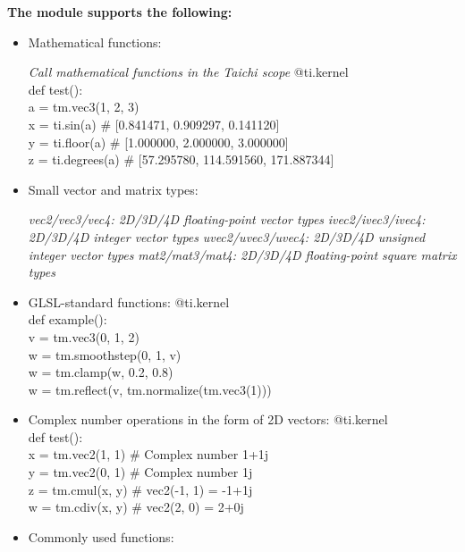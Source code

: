 \documentclass[10pt,landscape,a4paper]{article}
\newenvironment{myboxed}[1]
{\begin{mdframed}[linecolor=black,
                  backgroundcolor=white,
                  outerlinewidth=0.25pt,
                  innertopmargin=1ex,
                  topline=true,
                  rightline=true,
                  leftline=true,
                  bottomline=true,
                  linecolor=black!0,
                  frametitleaboveskip=0.5em,
                  frametitlebelowskip=0.5em,
                  innerbottommargin=.5\baselineskip,
                  innerrightmargin=.5em,
                  innerleftmargin=.5em,
                  frametitle={\footnotesize \RobotoSlab \bfseries \hspace*{0mm} #1},
                  frametitlebackgroundcolor=black!5,
                  frametitlerulewidth=2pt]}
{\end{mdframed}}
\begin{document}
\begin{multicols*}{5}
\begin{myboxed}{Math \hfill}
  \textbf{The module supports the following:}
  \begin{itemize}
  \item Mathematical functions:
  
  \textit{Call mathematical functions in the Taichi scope}
  {\ttfamily \scriptsize
  @ti.kernel \\
  def test(): \\
      a = tm.vec3(1, 2, 3) \\
      x = ti.sin(a) # [0.841471, 0.909297, 0.141120] \\
      y = ti.floor(a) # [1.000000, 2.000000, 3.000000] \\
      z = ti.degrees(a) # [57.295780, 114.591560, 171.887344]}
  
  \item Small vector and matrix types:

  \textit{vec2/vec3/vec4: 2D/3D/4D floating-point vector types}
  \textit{ivec2/ivec3/ivec4: 2D/3D/4D integer vector types}
  \textit{uvec2/uvec3/uvec4: 2D/3D/4D unsigned integer vector types}
  \textit{mat2/mat3/mat4: 2D/3D/4D floating-point square matrix types}
  
  \item GLSL-standard functions:
  {\ttfamily \scriptsize
  @ti.kernel \\
  def example(): \\
    v = tm.vec3(0, 1, 2) \\
    w = tm.smoothstep(0, 1, v) \\
    w = tm.clamp(w, 0.2, 0.8) \\
    w = tm.reflect(v, tm.normalize(tm.vec3(1)))}
  
  \item Complex number operations in the form of 2D vectors:
  {\ttfamily \scriptsize
  @ti.kernel \\
  def test(): \\
    x = tm.vec2(1, 1) # Complex number 1+1j \\
    y = tm.vec2(0, 1) # Complex number 1j \\
    z = tm.cmul(x, y) # vec2(-1, 1) = -1+1j \\
    w = tm.cdiv(x, y) # vec2(2, 0) = 2+0j}

  \item Commonly used functions:


\end{itemize}
\end{myboxed}
\end{multicols*}
\end{document}
